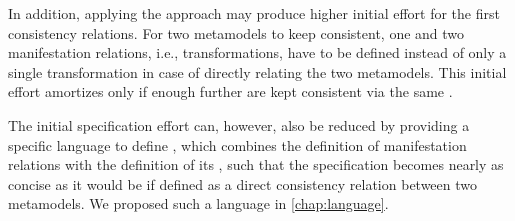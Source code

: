 In addition, applying the \commonalities approach may produce higher initial effort for the first consistency relations.
For two metamodels to keep consistent, one \conceptmetamodel and two manifestation relations, i.e., transformations, have to be defined instead of only a single transformation in case of directly relating the two metamodels.
This initial effort amortizes only if enough further \concretemetamodels are kept consistent via the same \conceptmetamodel.

The initial specification effort can, however, also be reduced by providing a specific language to define \commonalities, which combines the definition of manifestation relations with the definition of its \commonality, such that the specification becomes nearly as concise as it would be if defined as a direct consistency relation between two metamodels.
We proposed such a language in \autoref{chap:language}.




